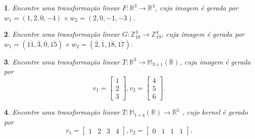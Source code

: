 \documentclass[12pt]{exam}
\newtheorem{exercicio}{}
\newcommand{\z}{\mathbb{Z}}
\newcommand{\real}{\mathbb{R}}
\newcommand{\cp}[1]{\mathbb{#1}}
\begin{document}
\begin{exercicio}
  Encontre uma transforma\c{c}\~ao linear $F : \real^3 \to \real^4$, cuja imagem \'e gerada por $w_1 = (1,2,0,-4)$ e $w_2 = (2,0,-1,-3)$.
\end{exercicio}

\begin{exercicio}
  Encontre uma transforma\c{c}\~ao linear $G : \z_{19}^3 \to \z_{19}^4$, cuja imagem \'e gerada por $w_1 = (\overline{11},\overline{3},\overline{0},\overline{15})$ e $w_2 = (\overline{2},\overline{1},\overline{18},\overline{17})$.
\end{exercicio}

\begin{exercicio}
  Encontre uma transforma\c{c}\~ao linear $T : \real^3 \to \cp{M}_{3 \times 1}(\real)$, cuja imagem \'e gerada por
  \[
    v_1 = \begin{bmatrix}
      1\\2\\3
    \end{bmatrix}, v_2 = \begin{bmatrix}
      4\\5\\6
    \end{bmatrix}.
  \]
\end{exercicio}

\begin{exercicio}
  Encontre uma transforma\c{c}\~ao linear $T : \cp{M}_{1 \times 4}(\real) \to \real^5$ , cujo kernel \'e gerado por
  \[
    v_1 = \begin{bmatrix}
      1 & 2 & 3 & 4
    \end{bmatrix}, v_2 = \begin{bmatrix}
      0 & 1 & 1 & 1
    \end{bmatrix}.
  \]
\end{exercicio}
\end{document}
